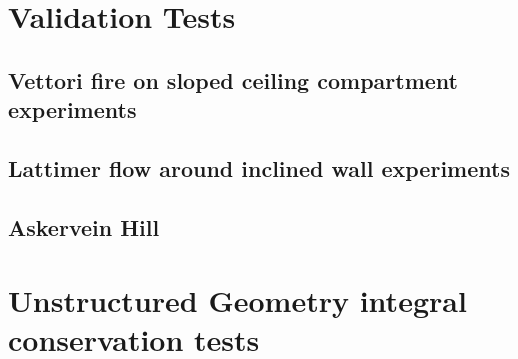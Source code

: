 \documentclass[12pt]{article}
\begin{document}
\clearpage

\section{Validation Tests}

\subsection{Vettori fire on sloped ceiling compartment experiments}





\subsection{Lattimer flow around inclined wall experiments}





\subsection{Askervein Hill}






\appendix

\section{Unstructured Geometry integral conservation tests}
\label{info:constests}
\end{document}
